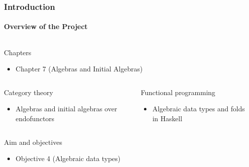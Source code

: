 \documentclass{beamer}
\begin{document}

\begin{frame}[label={chap:algebras}]
  \frametitle{Introduction}
  \framesubtitle{Overview of the Project}

  \begin{columns}[onlytextwidth,t]
    \begin{column}{\textwidth}
      \begin{block}{Chapters}
        \begin{itemize}
        \item Chapter 7 (Algebras and Initial Algebras)
        \end{itemize}
      \end{block}
    \end{column}
  \end{columns}
  \begin{columns}[onlytextwidth,t]
    \begin{column}{.5\textwidth}
      \begin{block}{Category theory}
        \begin{itemize}
        \item Algebras and initial algebras over endofunctors
        \end{itemize}
      \end{block}
    \end{column}
    \begin{column}{.5\textwidth}
      \begin{block}{Functional programming}
        \begin{itemize}
        \item Algebraic data types and folds in Haskell
        \end{itemize}
      \end{block}
    \end{column}
  \end{columns}
  \begin{columns}[onlytextwidth,t]
    \begin{column}{\textwidth}
      \begin{block}{Aim and objectives}
        \begin{itemize}
        \item Objective 4 (Algebraic data types)
        \end{itemize}
      \end{block}
    \end{column}
  \end{columns}

\end{frame}
\end{document}
